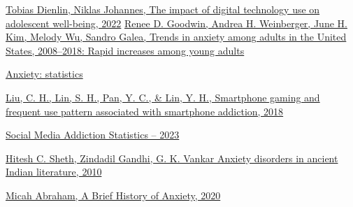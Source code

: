 \documentclass[a4paper]{article}
\begin{document}
		\begin{thebibliography}{9}
			
                \href{https://www.tandfonline.com/doi/full/10.31887/DCNS.2020.22.2/tdienlin?scroll=top&needAccess=true&role=tab&aria-labelledby=full-article}{ Tobias Dienlin, Niklas Johannes, The impact of digital technology use on adolescent well-being, 2022}
    		\href {https://www.sciencedirect.com/science/article/pii/S0022395620309250}{Renee D. Goodwin, Andrea H. Weinberger, June H. Kim, Melody Wu, Sandro Galea, Trends in anxiety among adults in the United States, 2008–2018: Rapid increases among young adults}
		
                \href{https://www.mentalhealth.org.uk/explore-mental-health/mental-health-statistics/anxiety-statistics}{ Anxiety: statistics}

            \href{https://www.researchgate.net/publication/305345662_Smartphone_gaming_and_frequent_use_pattern_associated_with_smartphone_addiction}{ Liu, C. H., Lin, S. H., Pan, Y. C., & Lin, Y. H., Smartphone gaming and frequent use pattern associated with smartphone addiction, 2018 }

                \href{ https://truelist.co/blog/social-media-addiction-statistics/}{ Social Media Addiction Statistics – 2023}
	
		
                \href{ https://www.ncbi.nlm.nih.gov/pmc/articles/PMC2990839/#sec1-1title}{ Hitesh C. Sheth, Zindadil Gandhi, G. K. Vankar Anxiety disorders in ancient Indian literature, 2010}

                \href{ https://www.calmclinic.com/brief-history-of-anxiety}{  Micah Abraham, A Brief History of Anxiety, 2020
}
                
		\end{thebibliography}
		
		
	
\end{document}
